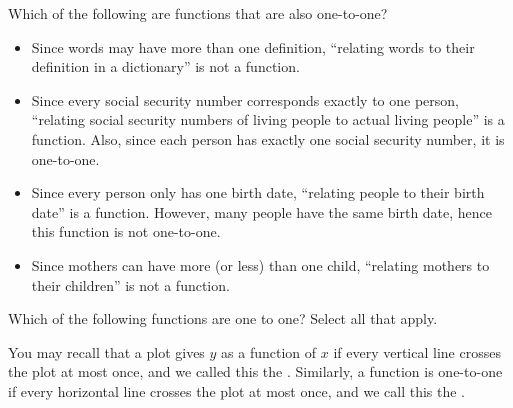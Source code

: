 \documentclass{ximera}
\begin{document}
\begin{question}
  Which of the following are functions that are also one-to-one?
  \begin{selectAll}
  \end{selectAll}
  \begin{feedback}\hfil
    \begin{itemize}
    \item Since words may have more than one definition, ``relating
      words to their definition in a dictionary'' is not a function.
    \item Since every social security number corresponds exactly to
      one person, ``relating social security numbers of living people
      to actual living people'' is a function. Also, since each person
      has exactly one social security number, it is one-to-one.
    \item Since every person only has one birth date, ``relating
      people to their birth date'' is a function. However, many people
      have the same birth date, hence this function is not one-to-one.
      \item Since mothers can have more (or less) than one child,
        ``relating mothers to their children'' is not a function.
    \end{itemize}
  \end{feedback}
\end{question}

\begin{question}
Which of the following functions are one to one?  Select all that
apply.
\begin{selectAll}
\end{selectAll}
\end{question}




You may recall that a plot gives $y$ as a function of $x$ if every
vertical line crosses the plot at most once, and we called this
the . Similarly, a function is one-to-one
if every horizontal line crosses the plot at most once, and we call this 
the .
\end{document}
